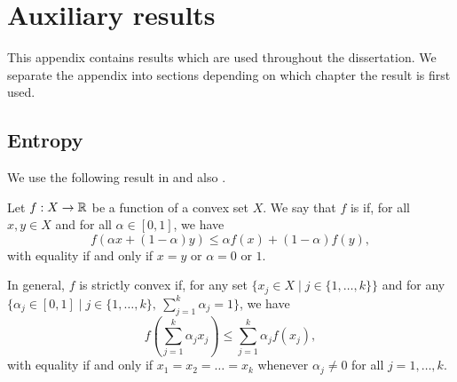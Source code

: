\chapter{Auxiliary results}
This appendix contains results which are used throughout the dissertation. We separate the appendix into sections depending on which chapter the result is first used.

\section{Entropy}
We use the following result in  and also .

\begin{definition}
	Let $f : X \to \mathbb{R}$ be a function of a convex set $X$. We say that $f$ is  if, for all $x, y \in X$ and for all $\alpha \in [0, 1]$, we have
	\[
		f(\alpha x + (1 - \alpha)y) \leq \alpha f(x) + (1 - \alpha)f(y),
	\]
	with equality if and only if $x = y$ or $\alpha = 0$ or $1$.
	
	In general, $f$ is strictly convex if, for any set $\{x_j \in X \mid j \in \{1, \dots, k\}\}$ and for any $\{\alpha_j \in [0, 1] \mid j \in \{1, \dots, k\},\ \sum_{j = 1}^k{\alpha_j} = 1\}$, we have
	\[
		f\left(\sum_{j = 1}^k{\alpha_j x_j}\right) \leq \sum_{j = 1}^k{\alpha_j} f(x_j),
	\]
	with equality if and only if $x_1 = x_2 = \dots = x_k$ whenever $\alpha_j \neq 0$ for all $j = 1, \dots, k$.
\end{definition}

